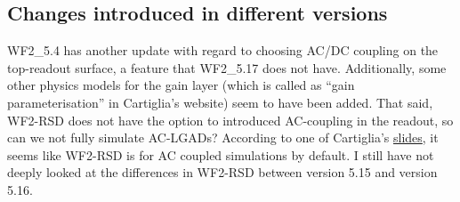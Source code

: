 \documentclass[11pt]{article}
\begin{document}
\subsection{Changes introduced in different versions}
WF2\_5.4 has another update with regard to choosing AC/DC coupling on the top-readout surface, a feature that WF2\_5.17 does not have. Additionally, some other physics models for the gain layer (which is called as ``gain parameterisation'' in Cartiglia's website) seem to have been added.
\newline
That said, WF2-RSD does not have the option to introduced AC-coupling in the readout, so can we not fully simulate AC-LGADs? According to one of Cartiglia's \href{https://indico.cern.ch/event/928957/contributions/3913535/attachments/2069369/3473666/FCCee_Cartiglia.pdf}{slides}, it seems like WF2-RSD is for AC coupled simulations by default.
\newline
I still have not deeply looked at the differences in WF2-RSD between version 5.15 and version 5.16.

\end{document}
